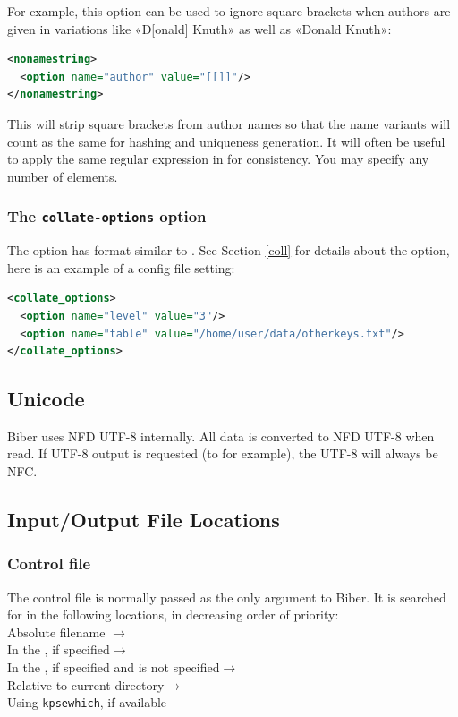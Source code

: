 \documentclass{ltxdockit}
\newcommand*{\biber}{Biber\xspace}
\begin{document}
For example, this option can be used to ignore square brackets when authors
are given in variations like «D[onald] Knuth» as well as «Donald Knuth»:

\begin{lstlisting}[language=xml]
<nonamestring>
  <option name="author" value="[[]]"/>
</nonamestring>
\end{lstlisting}

This will strip square brackets from author names so that the name variants
will count as the same for hashing and uniqueness generation. It will often
be useful to apply the same regular expression in  for
consistency. You may specify any number of  elements.
\bigskip
\subsubsection{The \texttt{collate-options} option}

The  option has format similar to
. See Section \ref{coll} for details about the option,
here is an example of a config file setting:

\begin{lstlisting}[language=xml]
<collate_options>
  <option name="level" value="3"/>
  <option name="table" value="/home/user/data/otherkeys.txt"/>
</collate_options>
\end{lstlisting}
\bigskip
\subsection{Unicode}
\biber uses NFD UTF-8 internally. All data is converted to NFD UTF-8
when read. If UTF-8 output is requested (to  for example),
the UTF-8 will always be NFC.
\bigskip
\subsection{Input/Output File Locations}

\subsubsection{Control file}\label{loc:cf}

The control file is normally passed as the only argument to \biber. It is
searched for in the following locations, in decreasing order of
priority:\\[2ex]

\noindent Absolute filename $\rightarrow$\\
\hspace*{1em}In the , if specified$\rightarrow$\\
\hspace*{2em}In the , if specified and
 is not specified$\rightarrow$\\
\hspace*{3em}Relative to current directory$\rightarrow$\\
\hspace*{4em}Using \verb+kpsewhich+, if available
\end{document}
